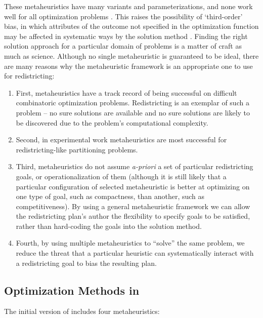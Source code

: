 \documentclass[article]{JSSstyle/jss}
\begin{document}
These metaheuristics have many variants and parameterizations, and none work well for all optimization problems \citep[][]{WolMac97}. This raises the possibility of  `third-order' bias, in which attributes of the outcome not specified in the optimization function may be affected in systematic ways by the solution method \citep[][]{Altman97}. Finding the right solution approach for a particular domain of problems is a matter of craft as much as science. Although no single metaheuristic is guaranteed to be ideal, there are many reasons 
why the metaheuristic framework is an appropriate one to use for redistricting:
\begin{enumerate}
\item First, metaheuristics have a track record of being successful on difficult combinatoric 
optimization problems. Redistricting is an exemplar of such a problem -- no sure solutions 
are available and no sure solutions are likely to be discovered due to the problem's computational complexity.
\item Second, in experimental work metaheuristics are most successful 
for redistricting-like partitioning problems.
\item Third, metaheuristics do not assume \emph{a-priori} a set of 
particular redistricting goals, or operationalization of them (although 
it is still likely that a particular configuration of selected metaheuristic is better at optimizing on one
type of goal, such as compactness, than another, such as competitiveness). 
By using a general metaheuristic framework we can allow the redistricting plan's author 
the flexibility to specify goals to be satisfied, rather than hard-coding the
goals into the solution method.
\item Fourth, by using multiple metaheuristics to ``solve'' the same problem, 
we reduce the threat that a particular heuristic can systematically interact 
with a redistricting goal to bias the resulting plan.
\end{enumerate}

\subsection[Optimization Methods in BARD]{Optimization Methods in }

The initial version of  includes four metaheuristics: 
\end{document}
